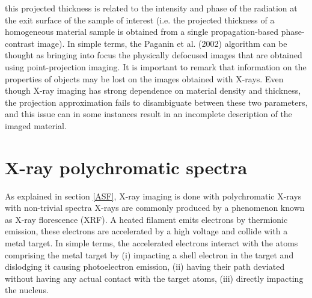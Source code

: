 \documentclass[10pt, a4paper, singlespacing]{report}
\begin{document}
this projected thickness is related to the intensity and phase of the radiation at the exit surface of the sample of interest (i.e. the projected thickness of a homogeneous material sample is obtained from a single propagation-based phase-contrast image).
In simple terms, the Paganin et al. (2002) algorithm can be thought as bringing into focus the physically defocused images that are obtained using point-projection imaging\cite{Pags2002}.
It is important to remark that information on the properties of objects may be lost on the images obtained with X-rays. Even though X-ray imaging has strong dependence on material density and thickness\cite{CH49}, the projection approximation fails to disambiguate between these two parameters, and this issue can in some instances result in an incomplete description of the imaged material.
\section{X-ray polychromatic spectra}\label{poly}
As explained in section \ref{ASF}, X-ray imaging is done with polychromatic X-rays with non-trivial spectra\cite{CH49}
X-rays are commonly produced by a phenomenon known as X-ray florescence (XRF). A heated filament emits electrons by thermionic emission, these electrons are accelerated by a high voltage and collide with a metal target. In simple terms, the accelerated electrons interact with the atoms comprising the metal target by (i) impacting a shell electron in the target and dislodging it causing photoelectron emission, (ii) having their path deviated without having any actual contact with the target atoms, (iii) directly impacting the nucleus.
\end{document}
